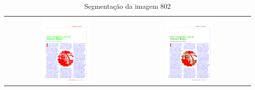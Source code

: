 \documentclass[a4paper,11pt]{article}
\begin{document}
    \begin{table}[p]
      \caption{Segmentação da imagem 802}
      \begin{center}
        \begin{tabular}{ c c }
        \includegraphics[width=0.4\textwidth]{assets/final_ideal/cacm_802_ideal.png}
        &
        \includegraphics[width=0.4\textwidth]{assets/result_imagens/cacm_50_percent_sparse_9x9_802_final.png}
        \end{tabular}
      \end{center}
      \label{tab:segmentation_802}
    \end{table}
\end{document}
